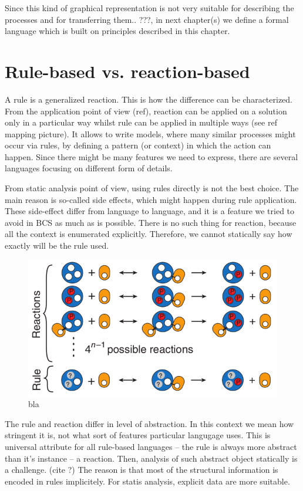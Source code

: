 \documentclass[12pt]{fithesis2}
\begin{document}
Since this kind of graphical representation is not very suitable for describing the processes and for transferring them.. ???, in next chapter(s) we define a formal language which is built on principles described in this chapter.

\section{Rule-based vs. reaction-based}

A rule is a generalized reaction. This is how the difference can be characterized. From the application point of view (ref), reaction can be applied on a solution only in a particular way whilst rule can be applied in multiple ways (see ref mapping picture). It allows to write models, where many similar processes might occur via rules, by defining a pattern (or context) in which the action can happen. Since there might be many features we need to express, there are several languages focusing on different form of details.  

From static analysis point of view, using rules directly is not the best choice. The main reason is so-called side effects, which might happen during rule application. These side-effect differ from language to language, and it is a feature we tried to avoid in BCS as much as is possible. There is no such thing for reaction, because all the context is enumerated explicitly. Therefore, we cannot statically say how exactly will be the rule used.

\begin{figure}
\begin{center}
\includegraphics[scale=0.5]{reaction_vs_rule}
\end{center}
\caption{bla}
\end{figure}

The rule and reaction differ in level of abstraction. In this context we mean how stringent it is, not what sort of features particular langugage uses. This is universal attribute for all rule-based languages -- the rule is always more abstract than it's instance -- a reaction. Then, analysis of such abstract object statically is a challenge. (cite ?) The reason is that most of the structural information is encoded in rules implicitely. For statis analysis, explicit data are more suitable.
\end{document}
